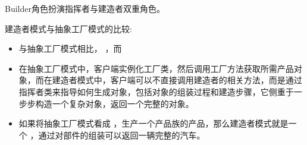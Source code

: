 \documentclass[letterpaper,10pt,english]{sphinxmanual}
\begin{document}
\sphinxAtStartPar
Builder角色扮演指挥者与建造者双重角色。

\sphinxAtStartPar
建造者模式与抽象工厂模式的比较:
\begin{itemize}
\item {} 
\sphinxAtStartPar
与抽象工厂模式相比，  ，而 

\item {} 
\sphinxAtStartPar
在抽象工厂模式中，客户端实例化工厂类，然后调用工厂方法获取所需产品对象，而在建造者模式中，客户端可以不直接调用建造者的相关方法，而是通过指挥者类来指导如何生成对象，包括对象的组装过程和建造步骤，它侧重于一步步构造一个复杂对象，返回一个完整的对象。

\item {} 
\sphinxAtStartPar
如果将抽象工厂模式看成  ，生产一个产品族的产品，那么建造者模式就是一个  ，通过对部件的组装可以返回一辆完整的汽车。

\end{itemize}
\end{document}
